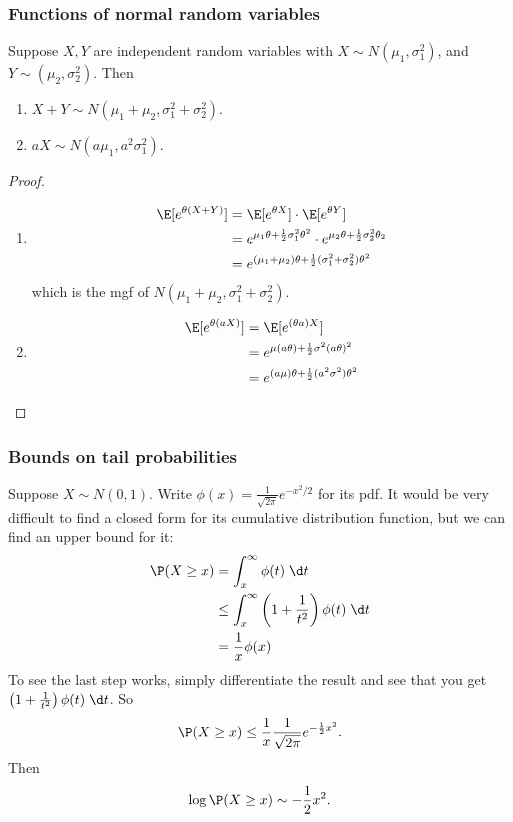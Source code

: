 \documentclass[a4paper]{article}
\begin{document}
\subsubsection{Functions of normal random variables}
\begin{thm}
  Suppose $X, Y$ are independent random variables with $X\sim N(\mu_1, \sigma_1^2)$, and $Y\sim (\mu_2, \sigma_2^2)$. Then
  \begin{enumerate}
    \item $X + Y \sim N(\mu_1 + \mu_2 , \sigma_1^2 + \sigma_2^2)$.
    \item $aX \sim N(a\mu_1, a^2 \sigma_1^2)$.
  \end{enumerate}
\end{thm}

\begin{proof}\leavevmode
  \begin{enumerate}
    \item 
      \begin{align*}
        \E[e^{\theta(X + Y)}] &= \E[e^{\theta X}] \cdot \E[e^{\theta Y}]\\
        &= e^{\mu_1 \theta + \frac{1}{2}\sigma_1^2\theta^2} \cdot e^{\mu_2 \theta + \frac{1}{2}\sigma_2^2 \theta_2}\\
        &= e^{(\mu_1 + \mu_2)\theta + \frac{1}{2}(\sigma_1^2 + \sigma_2^2)\theta^2} 
      \end{align*}
      which is the mgf of $N(\mu_1 + \mu_2, \sigma_1^2 + \sigma_2^2)$.
    \item
      \begin{align*}
        \E[e^{\theta (aX)}] &= \E[e^{(\theta a)X}]\\
        &= e^{\mu(a\theta) + \frac{1}{2}\sigma^2 (a \theta)^2}\\
        &= e^{(a\mu)\theta + \frac{1}{2}(a^2\sigma^2)\theta^2}
      \end{align*}
  \end{enumerate}
\end{proof}

\subsubsection{Bounds on tail probabilities}
Suppose $X\sim N(0, 1)$. Write $\phi(x) = \frac{1}{\sqrt{2\pi}} e^{-x^2/2}$ for its pdf. It would be very difficult to find a closed form for its cumulative distribution function, but we can find an upper bound for it:
\begin{align*}
  \P(X \geq x) &= \int_x^\infty \phi(t)\;\d t\\
  &\leq \int_x^\infty \left(1 + \frac{1}{t^2}\right)\phi(t)\;\d t \\
  &= \frac{1}{x}\phi(x)
\end{align*}
To see the last step works, simply differentiate the result and see that you get $\left(1 + \frac{1}{t^2}\right)\phi(t)\;\d t$.
So
\[
  \P(X \geq x) \leq \frac{1}{x}\frac{1}{\sqrt{2\pi}}e^{-\frac{1}{2}x^2}.
\]
Then
\[
  \log \P(X \geq x)\sim -\frac{1}{2}x^2.
\]
\end{document}
